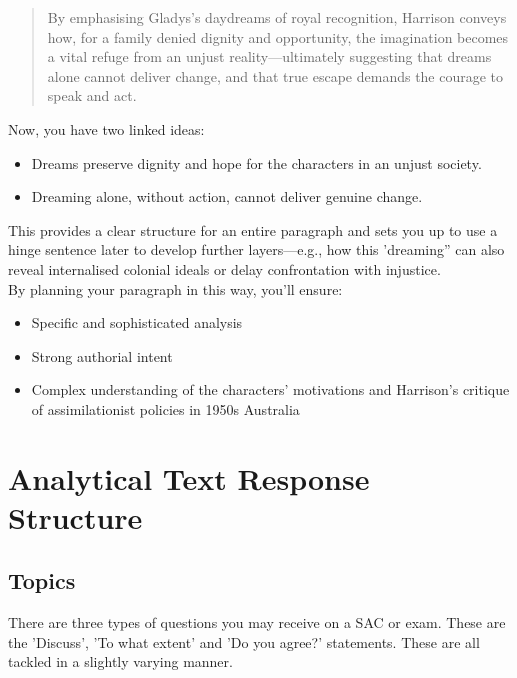 \documentclass[a4paper]{article}
\begin{document}
\begin{quote}
    By emphasising Gladys’s daydreams of royal recognition, Harrison conveys how, for a family denied dignity and opportunity, the imagination becomes a vital refuge from an unjust reality—ultimately suggesting that dreams alone cannot deliver change, and that true escape demands the courage to speak and act.
\end{quote}

Now, you have two linked ideas:
\begin{itemize}
    \item Dreams preserve dignity and hope for the characters in an unjust society.
    \item Dreaming alone, without action, cannot deliver genuine change.
\end{itemize}

This provides a clear structure for an entire paragraph and sets you up to use a hinge sentence later to develop further layers—e.g., how this 'dreaming” can also reveal internalised colonial ideals or delay confrontation with injustice.\\

By planning your paragraph in this way, you’ll ensure:
\begin{itemize}
    \item Specific and sophisticated analysis
    \item Strong authorial intent
    \item Complex understanding of the characters’ motivations and Harrison’s critique of assimilationist policies in 1950s Australia
\end{itemize}












\newpage
\section{Analytical Text Response Structure}

\subsection{Topics}
There are three types of questions you may receive on a SAC or exam. These are the 'Discuss', 'To what extent' and 'Do you agree?' statements. These are all tackled in a slightly varying manner.\\
\end{document}
